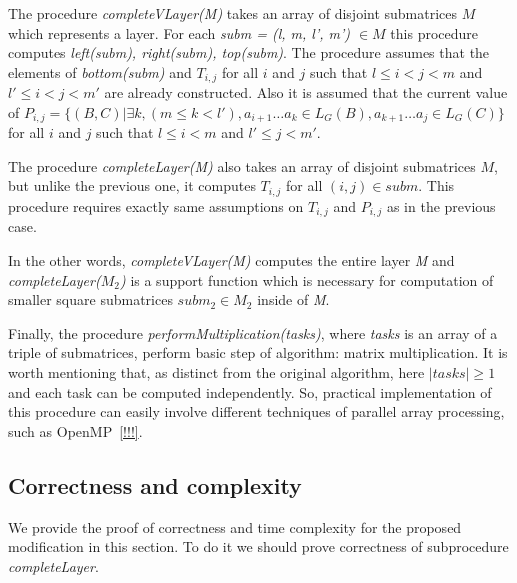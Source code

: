 The procedure \textit{completeVLayer(M)} takes an array of disjoint submatrices $M$ which represents a layer.
For each \textit{subm = (l, m, l', m') $\in M$} this procedure computes \textit{left(subm), right(subm), top(subm)}.
The procedure assumes that the elements of \textit{bottom(subm)} and $T_{i, j}$ for all $i$ and $j$ such that $l \leq i < j < m$ and $  l' \leq i < j < m'$ are already constructed.
Also it is assumed that the current value of
$P_{i, j} =  \{ (B, C) | \exists k, (m \le k < l'), a_{i + 1} \dots a_{k} \in L_G(B), a_{k + 1} \dots a_{j} \in L_G(C)\} $ for all $i$ and $j$ such that $l \leq i < m$ and $l' \leq j < m'$.

The procedure \textit{completeLayer(M)} also takes an array of disjoint submatrices $M$, but unlike the previous one, it computes $T_{i, j}$ for all $(i, j) \in subm$.
This procedure requires exactly same assumptions on $T_{i, j}$  and $P_{i, j}$  as in the previous case.

In the other words, \textit{completeVLayer(M)} computes the entire layer \textit{M} \linebreak and \textit{completeLayer($M_{2}$)} is a support function which is necessary for computation of smaller square submatrices $subm_{2} \in M_{2}$ inside of \textit{M}.  

Finally, the procedure \textit{performMultiplication(tasks)}, where \textit{tasks} is an array of a triple of submatrices, perform basic step of algorithm: matrix multiplication. It is worth mentioning that, as distinct from the original algorithm, here $|tasks| \ge 1$ and each task can be computed independently.
So, practical implementation of this procedure can easily involve different techniques of parallel array processing, such as OpenMP~\ref{!!!}.


\subsection{Correctness and complexity}

We provide the proof of correctness and time complexity for the proposed modification in this section.
To do it we should prove correctness of subprocedure \textit{completeLayer}.

